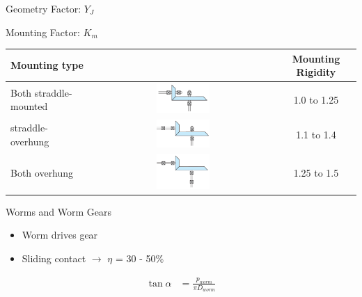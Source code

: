 \documentclass[
10pt,
a4paper,
openany,
svgnames,
]{book}
\begin{document}
\begin{frame}{Geometry Factor: $Y_{J}$}
  \begin{figure}[htbp]
    \centering
  \end{figure}
\end{frame}

\begin{frame}{Mounting Factor: $K_{m}$}
  \begin{table}[htbp]
    \centering
    \begin{tabular}{lcc}
      \toprule
      Mounting type & & Mounting Rigidity \\
      \midrule
      Both straddle-mounted & \includegraphics[width=0.3\textwidth]{pictures/Gears/both-straddle} & 1.0 to 1.25 \\
      straddle-overhung & \includegraphics[width=0.3\textwidth]{pictures/Gears/straddle-overhung} & 1.1 to 1.4 \\
      Both overhung & \includegraphics[width=0.3\textwidth]{pictures/Gears/both-overhung} & 1.25 to 1.5 \\
      \bottomrule
    \end{tabular}
  \end{table}
\end{frame}

\begin{frame}{Worms and Worm Gears}
      \begin{figure}[htbp]
        \centering
      \end{figure}
      \begin{itemize}
        \item Worm drives gear
        \item Sliding contact $\rightarrow$ $\eta$ = 30 - 50\%
      \end{itemize}
      \begin{align*}
        \tan \alpha &= \frac{p_{worm}}{\pi D_{worm}} \\
      \end{align*}
\end{frame}
\end{document}
